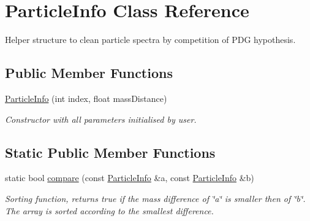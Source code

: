 \hypertarget{structParticleInfo}{}\section{Particle\+Info Class Reference}
\label{structParticleInfo}


Helper structure to clean particle spectra by competition of P\+DG hypothesis.  


\subsection*{Public Member Functions}
\begin{DoxyCompactItemize}
\item 
\hyperlink{structParticleInfo_a7cd2f8ebf8a81acf75abbb185542ca90}{Particle\+Info} (int index, float mass\+Distance)\hypertarget{structParticleInfo_a7cd2f8ebf8a81acf75abbb185542ca90}{}\label{structParticleInfo_a7cd2f8ebf8a81acf75abbb185542ca90}

\begin{DoxyCompactList}\small\item\em Constructor with all parameters initialised by user. \end{DoxyCompactList}\end{DoxyCompactItemize}
\subsection*{Static Public Member Functions}
\begin{DoxyCompactItemize}
\item 
static bool \hyperlink{structParticleInfo_ac6b16e53301a12af77466c927e13f703}{compare} (const \hyperlink{structParticleInfo}{Particle\+Info} \&a, const \hyperlink{structParticleInfo}{Particle\+Info} \&b)\hypertarget{structParticleInfo_ac6b16e53301a12af77466c927e13f703}{}\label{structParticleInfo_ac6b16e53301a12af77466c927e13f703}

\begin{DoxyCompactList}\small\item\em Sorting function, returns true if the mass difference of \char`\"{}a\char`\"{} is smaller then of \char`\"{}b\char`\"{}. The array is sorted according to the smallest difference. \end{DoxyCompactList}\end{DoxyCompactItemize}
